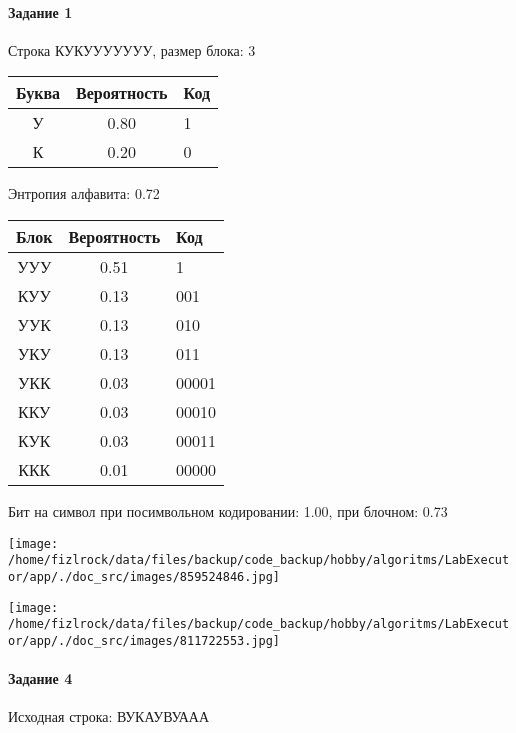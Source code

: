 \documentclass[a4paper, 12pt]{article}
\begin{document}
\paragraph{Задание 1}

Строка КУКУУУУУУУ, размер блока: 3
\begin{center}
 \begin{tabular}{ |c|c|l| } 
  \hline
     Буква & Вероятность & Код\\ \hline
У & 0.80 & 1\\\hline
К & 0.20 & 0
\\ \hline \end{tabular}
\end{center}
Энтропия алфавита: 0.72
\begin{center}
 \begin{tabular}{ |c|c|l| } 
  \hline
     Блок & Вероятность & Код\\ \hline
УУУ & 0.51 & 1\\\hline
КУУ & 0.13 & 001\\\hline
УУК & 0.13 & 010\\\hline
УКУ & 0.13 & 011\\\hline
УКК & 0.03 & 00001\\\hline
ККУ & 0.03 & 00010\\\hline
КУК & 0.03 & 00011\\\hline
ККК & 0.01 & 00000
\\ \hline \end{tabular}
\end{center}
Бит на символ при посимвольном кодировании: 1.00, при блочном: 0.73

\texttt{[image: /home/fizlrock/data/files/backup/code\_backup/hobby/algoritms/LabExecutor/app/./doc\_src/images/859524846.jpg]}

\texttt{[image: /home/fizlrock/data/files/backup/code\_backup/hobby/algoritms/LabExecutor/app/./doc\_src/images/811722553.jpg]}
\paragraph{Задание 4}


Исходная строка: ВУКАУВУААА
\end{document}
